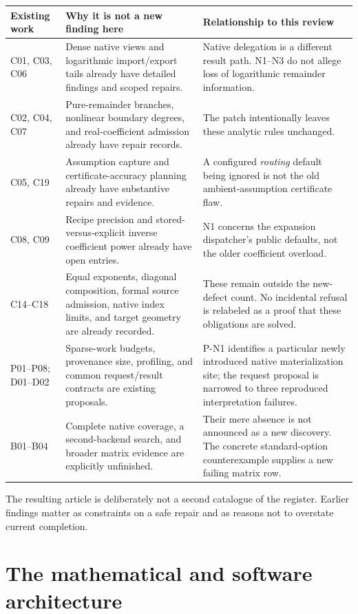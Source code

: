 \documentclass[11pt,a4paper]{article}
\begin{document}
\begin{longtable}{@{}P{30mm}P{69mm}P{51mm}@{}}
\toprule
Existing work & Why it is not a new finding here & Relationship to this review\\
\midrule
\endhead
C01, C03, C06 & Dense native views and logarithmic import/export tails already have detailed findings and scoped repairs. & Native delegation is a different result path. N1--N3 do not allege loss of logarithmic remainder information.\\[4pt]
C02, C04, C07 & Pure-remainder branches, nonlinear boundary degrees, and real-coefficient admission already have repair records. & The patch intentionally leaves these analytic rules unchanged.\\[4pt]
C05, C19 & Assumption capture and certificate-accuracy planning already have substantive repairs and evidence. & A configured \emph{routing} default being ignored is not the old ambient-assumption certificate flaw.\\[4pt]
C08, C09 & Recipe precision and stored-versus-explicit inverse coefficient power already have open entries. & N1 concerns the expansion dispatcher's public defaults, not the older coefficient overload.\\[4pt]
C14--C18 & Equal exponents, diagonal composition, formal source admission, native index limits, and target geometry are already recorded. & These remain outside the new-defect count. No incidental refusal is relabeled as a proof that these obligations are solved.\\[4pt]
P01--P08; D01--D02 & Sparse-work budgets, provenance size, profiling, and common request/result contracts are existing proposals. & P-N1 identifies a particular newly introduced native materialization site; the request proposal is narrowed to three reproduced interpretation failures.\\[4pt]
B01--B04 & Complete native coverage, a second-backend search, and broader matrix evidence are explicitly unfinished. & Their mere absence is not announced as a new discovery. The concrete standard-option counterexample supplies a new failing matrix row.\\
\bottomrule
\end{longtable}

The resulting article is deliberately not a second catalogue of the register. Earlier findings matter as constraints on a safe repair and as reasons not to overstate current completion.

\section{The mathematical and software architecture}
\label{sec:architecture}
\end{document}
